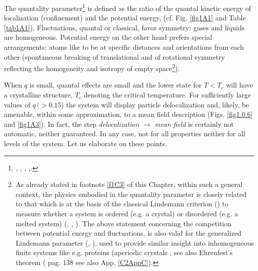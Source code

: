 The quantality parameter\footnote{\cite{Nosanow:76}, \cite{deBoer:57}, \cite{deBoer:48}, \cite{deBoer:48b},\cite{Mottelson:02}.} is defined as the ratio of the quantal kinetic energy of localization (confinement) and the potential energy, (cf. Fig. \ref{fig1A1} and Table \ref{tab1A1}).
 Fluctuations, quantal or classical, favor symmetry: gases and liquids are homogeneous. Potential energy on the other hand prefers special arrangements: atoms like to be at specific distances and orientations from each other (spontaneous breaking of translational and of rotational symmetry reflecting the homogeneity and isotropy of empty space\footnote{As already stated in footnote \ref{f1C3} of this Chapter, within such a  general context, the physics embodied in the quantality parameter is closely related to that which is at the basis of the classical Lindemann criterion (\cite{Lindemann:10}) to measure whether a system is ordered (e.g. a crystal) or disordered (e.g. a melted system) (\cite{Bilgram:87}, \cite{Lowen:94}, \cite{Stillinger:90,Stillinger:95}). The above statement concerning the competition between potential energy and fluctuations,  is also valid for the generalized Lindemann parameter (\cite{Stillinger:90}, \cite{Zhou:99}), used to provide similar insight into inhomogeneous finite systems like e.g. proteins (aperiodic crystals \cite{Schrodinger:44}, see also Ehrenfest's theorem (\cite{Basdevant:05} pag. 138 see also App. \ref{C2AppC}).}).
 
 
  When $q$ is small, quantal effects are small and the lower state for $T<T_c$ will have a crystalline structure, $T_c$ denoting the critical temperature.  For sufficiently large values of $q\, (>0.15$) the system will display particle delocalization and,  likely, be  amenable, within some approximation, to a mean field description (Figs. \ref{fig1.0.6} and   \ref{fig1A3}). In fact, the step \textit{delocalization $\rightarrow$ mean field} is certainly not automatic, neither guaranteed. In any case, not for all properties neither for all levels of the system. Let us elaborate on these points. 
  
